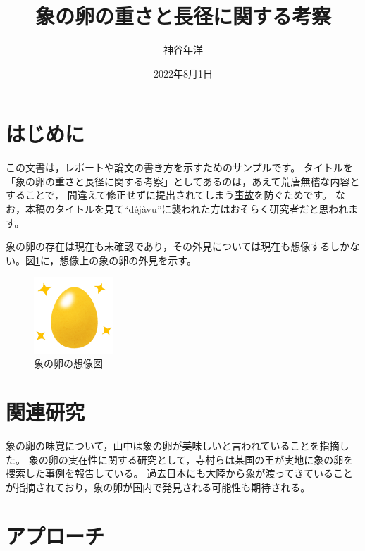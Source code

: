 \documentclass[dvipdfmx]{jsarticle}
\begin{document}
\title{象の卵の重さと長径に関する考察}
\author{神谷年洋}
\date{2022年8月1日}
\maketitle

\section{はじめに}

この文書は，レポートや論文の書き方を示すためのサンプルです。
タイトルを「象の卵の重さと長径に関する考察」としてあるのは，あえて荒唐無稽な内容とすることで，
間違えて修正せずに提出されてしまう\href{https://twitter.com/taku_ymnk/status/392959147974471681?s=20&t=3p7I92WEGvoPpj_7d-dtyA}{事故}を防ぐためです。 %
なお，本稿のタイトルを見て``d\'{e}j\`{a}vu''に襲われた方はおそらく研究者だと思われます。 %

象の卵の存在は現在も未確認であり，その外見については現在も想像するしかない。図\ref{fig:golden_egg}に，想像上の象の卵の外見を示す。 %

\begin{figure}[htp]
\centering
\includegraphics[width=3cm]{golden_egg.png}
\caption{象の卵の想像図}
\label{fig:golden_egg} %
\end{figure}

\section{関連研究}
\label{sec:related} %

象の卵の味覚について，山中\cite{kakenhi_latex}は象の卵が美味しいと言われていることを指摘した。 %
象の卵の実在性に関する研究として，寺村ら\cite{teramura2009}は某国の王が実地に象の卵を捜索した事例を報告している。
過去日本にも大陸から象が渡ってきていることが指摘\cite{kamei1990}されており，象の卵が国内で発見される可能性も期待される。

\section{アプローチ}
\end{document}
